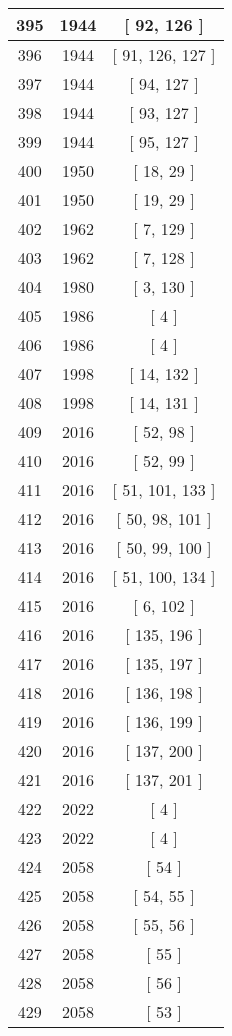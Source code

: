 \begin{center}
\begin{longtable}[H]{|| c c c ||}
\hline
395 & 1944 & [ 92, 126 ] \\ 
\hline
396 & 1944 & [ 91, 126, 127 ] \\ 
\hline
397 & 1944 & [ 94, 127 ] \\ 
\hline
398 & 1944 & [ 93, 127 ] \\ 
\hline
399 & 1944 & [ 95, 127 ] \\ 
\hline
400 & 1950 & [ 18, 29 ] \\ 
\hline
401 & 1950 & [ 19, 29 ] \\ 
\hline
402 & 1962 & [ 7, 129 ] \\ 
\hline
403 & 1962 & [ 7, 128 ] \\ 
\hline
404 & 1980 & [ 3, 130 ] \\ 
\hline
405 & 1986 & [ 4 ] \\ 
\hline
406 & 1986 & [ 4 ] \\ 
\hline
407 & 1998 & [ 14, 132 ] \\ 
\hline
408 & 1998 & [ 14, 131 ] \\ 
\hline
409 & 2016 & [ 52, 98 ] \\ 
\hline
410 & 2016 & [ 52, 99 ] \\ 
\hline
411 & 2016 & [ 51, 101, 133 ] \\ 
\hline
412 & 2016 & [ 50, 98, 101 ] \\ 
\hline
413 & 2016 & [ 50, 99, 100 ] \\ 
\hline
414 & 2016 & [ 51, 100, 134 ] \\ 
\hline
415 & 2016 & [ 6, 102 ] \\ 
\hline
416 & 2016 & [ 135, 196 ] \\ 
\hline
417 & 2016 & [ 135, 197 ] \\ 
\hline
418 & 2016 & [ 136, 198 ] \\ 
\hline
419 & 2016 & [ 136, 199 ] \\ 
\hline
420 & 2016 & [ 137, 200 ] \\ 
\hline
421 & 2016 & [ 137, 201 ] \\ 
\hline
422 & 2022 & [ 4 ] \\ 
\hline
423 & 2022 & [ 4 ] \\ 
\hline
424 & 2058 & [ 54 ] \\ 
\hline
425 & 2058 & [ 54, 55 ] \\ 
\hline
426 & 2058 & [ 55, 56 ] \\ 
\hline
427 & 2058 & [ 55 ] \\ 
\hline
428 & 2058 & [ 56 ] \\ 
\hline
429 & 2058 & [ 53 ] \\ 

\end{longtable}
\end{center}
